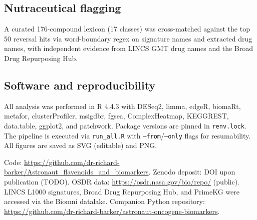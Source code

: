 \documentclass[pdflatex,sn-nature]{sn-jnl}
\begin{document}
\subsection{Nutraceutical flagging}
A curated 176-compound lexicon (17 classes) was cross-matched against the top 50
reversal hits via word-boundary regex on signature names and extracted drug names,
with independent evidence from LINCS GMT drug names and the Broad Drug Repurposing
Hub.

\subsection{Software and reproducibility}
All analysis was performed in R 4.4.3 with DESeq2, limma, edgeR, biomaRt, metafor,
clusterProfiler, msigdbr, fgsea, ComplexHeatmap, KEGGREST, data.table, ggplot2, and
patchwork. Package versions are pinned in \texttt{renv.lock}. The pipeline is
executed via \texttt{run\_all.R} with \texttt{--from}/\texttt{--only} flags for
resumability. All figures are saved as SVG (editable) and PNG.

\backmatter

Code: \url{https://github.com/dr-richard-barker/Astronaut_flavenoids_and_biomarkers}.
Zenodo deposit: DOI upon publication (TODO). OSDR data:
\url{https://osdr.nasa.gov/bio/repo/} (public). LINCS L1000 signatures, Broad Drug
Repurposing Hub, and PrimeKG were accessed via the Biomni datalake. Companion Python
repository: \url{https://github.com/dr-richard-barker/astronaut-oncogene-biomarkers}.


\end{document}
